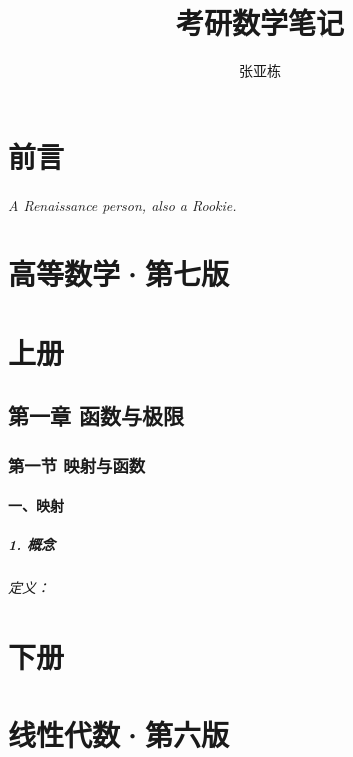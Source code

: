 \documentclass[12pt, twoside, a4paper]{book}
\begin{document}
\begin{CJK}{UTF8}{gbsn}
\frontmatter
{}
\title{考研数学笔记}
\author{张亚栋}
\maketitle

\part*{前言}
	\centering
	\paragraph{A Renaissance person, also a Rookie.}
\mainmatter
\part*{高等数学·第七版}
	\part*{上册}
    	\chapter*{第一章 函数与极限}
        	\section*{第一节 映射与函数}
            	\subsection*{一、映射}
                	\subsubsection*{1. 概念}
                    	\paragraph*{定义：}
    \part*{下册}
\part*{线性代数·第六版}

\backmatter
\end{CJK}
\end{document}
